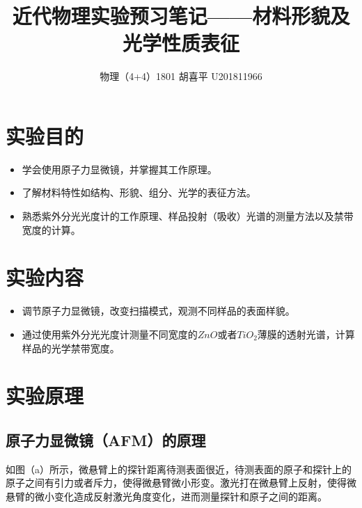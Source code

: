 \documentclass{article}
\author{物理（4+4）1801 \quad  胡喜平 \quad U201811966}
\affil{个人网站 https://hxp.plus/ \quad 电子邮件 hxp201406@gmail.com}
\title{近代物理实验预习笔记——材料形貌及光学性质表征}
\begin{document}
\maketitle

\section{实验目的}

\begin{itemize}
  
\item 学会使用原子力显微镜，并掌握其工作原理。
  
\item 了解材料特性如结构、形貌、组分、光学的表征方法。
  
\item 熟悉紫外分光光度计的工作原理、样品投射（吸收）光谱的测量方法以及禁带宽度的计算。

\end{itemize}

\section{实验内容}

\begin{itemize}
\item 调节原子力显微镜，改变扫描模式，观测不同样品的表面样貌。
\item 通过使用紫外分光光度计测量不同宽度的$ZnO$或者$TiO_2$薄膜的透射光谱，计算样品的光学禁带宽度。
\end{itemize}

\section{实验原理}

\subsection{原子力显微镜（AFM）的原理}

如图（a）所示，微悬臂上的探针距离待测表面很近，待测表面的原子和探针上的原子之间有引力或者斥力，使得微悬臂微小形变。激光打在微悬臂上反射，使得微悬臂的微小变化造成反射激光角度变化，进而测量探针和原子之间的距离。
\end{document}
